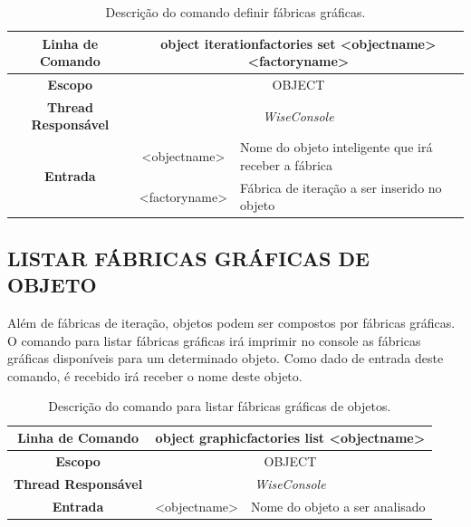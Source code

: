 \begin{center}
	\begin{table}[!htbp]
		\begin{tabularx}{\textwidth}{c|c|X}
			\toprule
			\textbf{Linha de Comando} & \multicolumn{2}{c}{object iteration\underline{\space\space}factories set <object\underline{\space\space}name> <factory\underline{\space\space}name>} \\
			\midrule
			\textbf{Escopo} & \multicolumn{2}{c}{OBJECT} \\
			\hline
			\textbf{Thread Responsável} & \multicolumn{2}{c}{\textit{WiseConsole}} \\
			\hline
			\multirow{2}{*}{\textbf{Entrada}} & <object\underline{\space\space}name> & Nome do objeto inteligente que irá receber a fábrica \\
			& <factory\underline{\space\space}name> & Fábrica de iteração a ser inserido no objeto \\
			\bottomrule
		\end{tabularx}
		\caption{Descrição do comando definir fábricas gráficas.}
		\label{tab:iteration_factories_set}
	\end{table}
\end{center}

\subsection{LISTAR FÁBRICAS GRÁFICAS DE OBJETO}\label{sec:graphic_factories_list}

Além de fábricas de iteração, objetos podem ser compostos por fábricas gráficas. O comando para listar fábricas gráficas irá imprimir no console as fábricas gráficas disponíveis para um determinado objeto. Como dado de entrada deste comando, é recebido irá receber o nome deste objeto.

\begin{center}
	\begin{table}[!htbp]
		\begin{tabularx}{\textwidth}{c|c|X}
			\toprule
			\textbf{Linha de Comando} & \multicolumn{2}{c}{object graphic\underline{\space\space}factories list <object\underline{\space\space}name>} \\
			\midrule
			\textbf{Escopo} & \multicolumn{2}{c}{OBJECT} \\
			\hline
			\textbf{Thread Responsável} & \multicolumn{2}{c}{\textit{WiseConsole}} \\
			\hline
			\textbf{Entrada} & <object\underline{\space\space}name> & Nome do objeto a ser analisado \\
			\bottomrule
		\end{tabularx}
		\caption{Descrição do comando para listar fábricas gráficas de objetos.}
		\label{tab:graphic_factories_list}
	\end{table}
\end{center}

